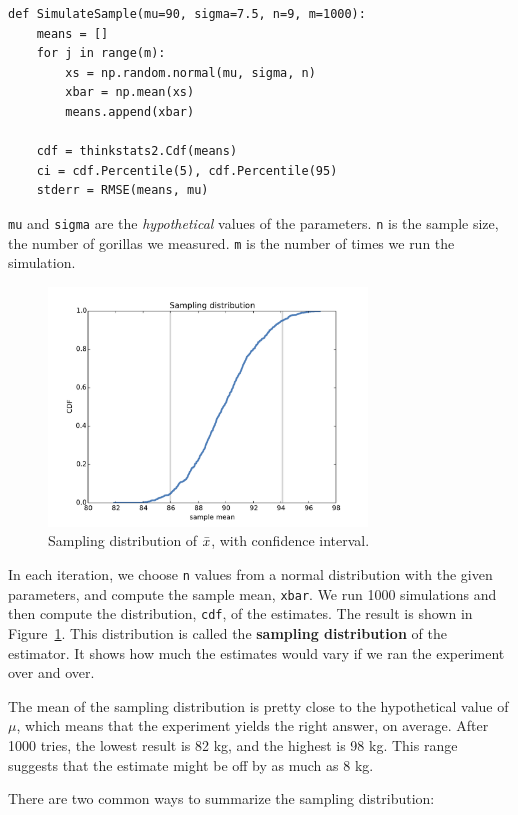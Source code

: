 \documentclass[12pt]{book}
\begin{document}
\begin{verbatim}
def SimulateSample(mu=90, sigma=7.5, n=9, m=1000):
    means = []
    for j in range(m):
        xs = np.random.normal(mu, sigma, n)
        xbar = np.mean(xs)
        means.append(xbar)

    cdf = thinkstats2.Cdf(means)
    ci = cdf.Percentile(5), cdf.Percentile(95)
    stderr = RMSE(means, mu)
\end{verbatim}

{\tt mu} and {\tt sigma} are the {\em hypothetical\/} values of
the parameters.  {\tt n} is the sample size, the number of
gorillas we measured.  {\tt m} is the number of times we run
the simulation.

\begin{figure}
\centerline{\includegraphics[height=2.5in]{figs/estimation1.pdf}}
\caption{Sampling distribution of $\bar{x}$, with confidence interval.}
\label{estimation1}
\end{figure}

In each iteration, we choose {\tt n} values from a normal
distribution with the given parameters, and compute the sample mean,
{\tt xbar}.  We run 1000 simulations and then compute the
distribution, {\tt cdf}, of the estimates.  The result is shown in
Figure~\ref{estimation1}.  This distribution is called the {\bf
  sampling distribution} of the estimator.  It shows how much the
estimates would vary if we ran the experiment over and over.

The mean of the sampling distribution is pretty close
to the hypothetical value of $\mu$, which means that the experiment
yields the right answer, on average.  After 1000 tries, the lowest
result is 82 kg, and the highest is 98 kg.  This range suggests that
the estimate might be off by as much as 8 kg.

There are two common ways to summarize the sampling distribution:
\end{document}
